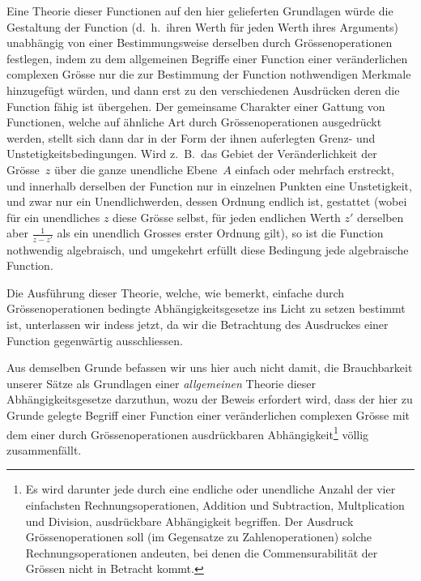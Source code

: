\documentclass[a4paper,12pt]{article}
\begin{document}
Eine Theorie dieser Functionen auf den hier gelieferten
Grundlagen w\"{u}rde die Gestaltung der Function (d.~h.\ ihren
Werth f\"{u}r jeden Werth ihres Arguments) unabh\"{a}ngig von
einer Bestimmungsweise derselben durch Gr\"{o}ssenoperationen
festlegen, indem zu dem allgemeinen Begriffe einer Function einer
ver\"{a}nderlichen complexen Gr\"{o}sse nur die zur Bestimmung
der Function nothwendigen Merkmale hinzugef\"{u}gt w\"{u}rden,
und dann erst zu den verschiedenen Ausdr\"{u}cken deren die
Function f\"{a}hig ist \"{u}bergehen.  Der gemeinsame Charakter
einer Gattung von Functionen, welche auf \"{a}hnliche Art durch
Gr\"{o}ssenoperationen ausgedr\"{u}ckt werden, stellt sich dann
dar in der Form der ihnen auferlegten Grenz- und
Unstetigkeitsbedingungen.  Wird z.~B.\ das Gebiet der
Ver\"{a}nderlichkeit der Gr\"{o}sse~$z$ \"{u}ber die ganze
unendliche Ebene~$A$ einfach oder mehrfach erstreckt, und
innerhalb derselben der Function nur in einzelnen Punkten eine
Unstetigkeit, und zwar nur ein Unendlichwerden, dessen Ordnung
endlich ist, gestattet (wobei f\"{u}r ein unendliches $z$ diese
Gr\"{o}sse selbst, f\"{u}r jeden endlichen Werth $z'$ derselben
aber
$\displaystyle \frac{1}{z - z'}$
als ein unendlich Grosses erster Ordnung gilt), so ist die
Function nothwendig algebraisch, und umgekehrt erf\"{u}llt diese
Bedingung jede algebraische Function.

Die Ausf\"{u}hrung dieser Theorie, welche, wie bemerkt, einfache
durch Gr\"{o}ssenoperationen bedingte Abh\"{a}ngigkeitsgesetze
ins Licht zu setzen bestimmt ist, unterlassen wir indess jetzt,
da wir die Betrachtung des Ausdruckes einer Function
gegenw\"{a}rtig ausschliessen.

Aus demselben Grunde befassen wir uns hier auch nicht damit, die
Brauchbarkeit unserer S\"{a}tze als Grundlagen einer
\emph{allgemeinen} Theorie dieser Abh\"{a}ngigkeitsgesetze
darzuthun, wozu der Beweis erfordert wird, dass der hier zu
Grunde gelegte Begriff einer Function einer ver\"{a}nderlichen
complexen Gr\"{o}sse mit dem einer durch Gr\"{o}ssenoperationen
ausdr\"{u}ckbaren Abh\"{a}ngigkeit\footnote{Es wird darunter jede
durch eine endliche oder unendliche Anzahl der vier einfachsten
Rechnungsoperationen, Addition und Subtraction, Multplication und
Division, ausdr\"{u}ckbare Abh\"{a}ngigkeit begriffen.  Der
Ausdruck Gr\"{o}ssenoperationen soll (im Gegensatze zu
Zahlenoperationen) solche Rechnungsoperationen andeuten, bei
denen die Commensurabilit\"{a}t der Gr\"{o}ssen nicht in Betracht
kommt.}
v\"{o}llig zusammenf\"{a}llt.
\end{document}
